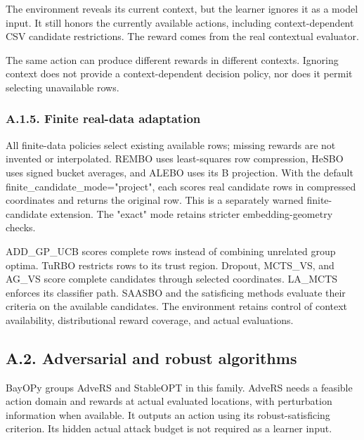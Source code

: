 \documentclass[10pt,a4paper]{article}
\begin{document}
The environment reveals its current context,\allowbreak{} but the learner ignores it as a model input. It still honors the currently available actions,\allowbreak{} including context-dependent CSV candidate restrictions. The reward comes from the real contextual evaluator.


The same action can produce different rewards in different contexts. Ignoring context does not provide a context-dependent decision policy,\allowbreak{} nor does it permit selecting unavailable rows.


\subsubsection*{A.1.5. Finite real-data adaptation}

All finite-data policies select existing available rows; missing rewards are not invented or interpolated. REMBO uses least-squares row compression,\allowbreak{} HeSBO uses signed bucket averages,\allowbreak{} and ALEBO uses its B projection. With the default finite\_\allowbreak{}candidate\_\allowbreak{}mode="project",\allowbreak{} each scores real candidate rows in compressed coordinates and returns the original row. This is a separately warned finite-candidate extension. The "exact" mode retains stricter embedding-geometry checks.


ADD\_\allowbreak{}GP\_\allowbreak{}UCB scores complete rows instead of combining unrelated group optima. TuRBO restricts rows to its trust region. Dropout,\allowbreak{} MCTS\_\allowbreak{}VS,\allowbreak{} and AG\_\allowbreak{}VS score complete candidates through selected coordinates. LA\_\allowbreak{}MCTS enforces its classifier path. SAASBO and the satisficing methods evaluate their criteria on the available candidates. The environment retains control of context availability,\allowbreak{} distributional reward coverage,\allowbreak{} and actual evaluations.


\subsection*{A.2. Adversarial and robust algorithms}

BayOPy groups AdveRS and StableOPT in this family. AdveRS needs a feasible action domain and rewards at actual evaluated locations,\allowbreak{} with perturbation information when available. It outputs an action using its robust-satisficing criterion. Its hidden actual attack budget is not required as a learner input.
\end{document}
